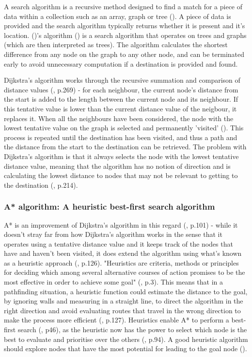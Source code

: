 \documentclass[11pt, a4paper]{article}
\begin{document}
A search algorithm is a recursive method designed to find a match for a piece of data within a collection such as an array, graph or tree (\cite{friedman1976algorithm}). A piece of data is provided and the search algorithm typically returns whether it is present and it's location. (\citeauthor{dijkstra1959note})'s algorithm (\citeyear{dijkstra1959note}) is a search algorithm that operates on trees and graphs (which are then interpreted as trees). The algorithm calculates the shortest difference from any node on the graph to any other node, and can be terminated early to avoid unnecessary computation if a destination is provided and found.

Dijkstra's algorithm works through the recursive summation and comparison of distance values (\cite{dijkstra1959note}, p.269) - for each neighbour, the current node's distance from the start is added to the length between the current node and its neighbour. If this tentative value is lower than the current distance value of the neigbour, it replaces it. When all the neighbours have been considered, the node with the lowest tentative value on the graph is selected and permanently 'visited' (\cite{dijkstra1959note}). This process is repeated until the destination has been visited, and thus a path and the distance from the start to the destination can be retrieved. The problem with Dijkstra's algorithm is that it always selects the node with the lowest tentative distance value, meaning that the algorithm has no notion of direction and is calculating the lowest distance to nodes that may not be relevant to getting to the destination (\cite{millington2019ai}, p.214).

\subsubsection{A* algorithm: A heuristic best-first search algorithm}

A* is an improvement of Dijkstra's algorithm in this regard (\cite{hart1968formal}, p.101) - while it doesn't stray far from how Dijkstra's algorithm works in the sense that it operates using a tentative distance value and it keeps track of the nodes that have and haven't been visited, it does extend the algorithm using what's known as a heuristic approach (\cite{cui2011based}, p.126). "Heuristics are criteria, methods or principles for deciding which among several alternative courses of action promises to be the most effective in order to achieve some goal" (\cite{pearl1984heuristics}, p.3). This means that in a pathfinding situation, a heuristic function could estimate the distance to the goal, by ignoring walls and measuring in a straight line, to direct the algorithm in the right direction and avoid evaluating routes that travel in the wrong direction to make the process more efficient (\cite{cui2011based}, p.127). Heuristics enable A* to perform a best-first search (\cite{yap2002grid}, p46), as the heuristic now has the power to select which node is the best to evaluate and prioritise over the others (\cite{russell2016artificial}, p.94). A good heuristic algorithm should explore nodes that have the most potential for leading to the goal node (\cite{korf1985depth}).
\end{document}
